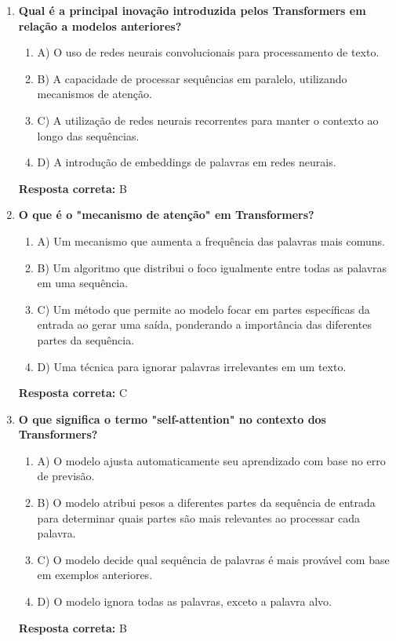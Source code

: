 \documentclass[14pt,a4paper,oneside]{book}
\begin{document}
\begin{enumerate}
	
	\item \textbf{Qual é a principal inovação introduzida pelos Transformers em relação a modelos anteriores?}
	\begin{enumerate}[label=\alph*)]
		\item A) O uso de redes neurais convolucionais para processamento de texto.
		\item B) A capacidade de processar sequências em paralelo, utilizando mecanismos de atenção.
		\item C) A utilização de redes neurais recorrentes para manter o contexto ao longo das sequências.
		\item D) A introdução de embeddings de palavras em redes neurais.
	\end{enumerate}
	\vspace{5mm}
	\textbf{Resposta correta:} B
	
	\item \textbf{O que é o "mecanismo de atenção" em Transformers?}
	\begin{enumerate}[label=\alph*)]
		\item A) Um mecanismo que aumenta a frequência das palavras mais comuns.
		\item B) Um algoritmo que distribui o foco igualmente entre todas as palavras em uma sequência.
		\item C) Um método que permite ao modelo focar em partes específicas da entrada ao gerar uma saída, ponderando a importância das diferentes partes da sequência.
		\item D) Uma técnica para ignorar palavras irrelevantes em um texto.
	\end{enumerate}
	\vspace{5mm}
	\textbf{Resposta correta:} C
	
	\item \textbf{O que significa o termo "self-attention" no contexto dos Transformers?}
	\begin{enumerate}[label=\alph*)]
		\item A) O modelo ajusta automaticamente seu aprendizado com base no erro de previsão.
		\item B) O modelo atribui pesos a diferentes partes da sequência de entrada para determinar quais partes são mais relevantes ao processar cada palavra.
		\item C) O modelo decide qual sequência de palavras é mais provável com base em exemplos anteriores.
		\item D) O modelo ignora todas as palavras, exceto a palavra alvo.
	\end{enumerate}
	\vspace{5mm}
	\textbf{Resposta correta:} B
	

\end{enumerate}
\end{document}
